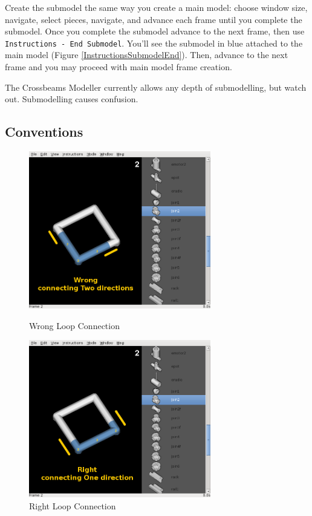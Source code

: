 \documentclass[12pt]{report}
\begin{document}
Create the submodel the same way you create a main model: choose
window size, navigate, select pieces, navigate, and advance each frame
until you complete the submodel.  Once you complete the submodel
advance to the next frame, then use {\tt Instructions - End Submodel}.
You'll see the submodel in blue attached to the main model (Figure
\ref{InstructionsSubmodelEnd}).  Then, advance to the next frame and
you may proceed with main model frame creation.

The Crossbeams Modeller currently allows any depth of submodelling,
but watch out.  Submodelling causes confusion.

\subsection{Conventions}

\begin{figure}[h]
\begin{minipage}[t]{0.5\textwidth}
\begin{center}
\includegraphics[width=3.125in]{doc_images/manual_instructions_loop_wrong.png}
\caption{Wrong Loop Connection}
\label{InstructionsLoopWrong}
\end{center}
\end{minipage}
\begin{minipage}[t]{0.5\textwidth}
\begin{center}
\includegraphics[width=3.125in]{doc_images/manual_instructions_loop_right.png}
\caption{Right Loop Connection}
\label{InstructionsLoopRight}
\end{center}
\end{minipage}
\end{figure}
\end{document}
